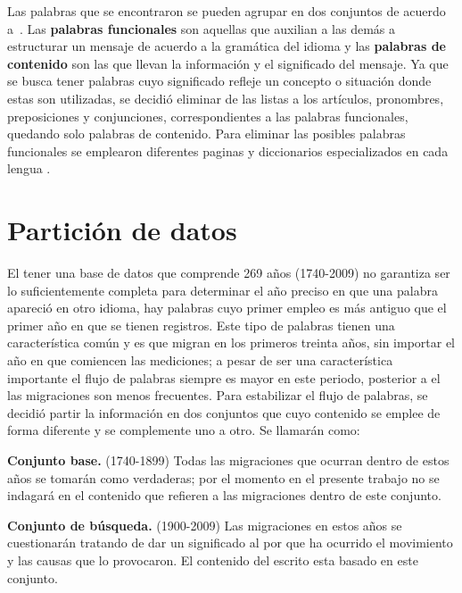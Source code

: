 Las palabras que se encontraron se pueden agrupar en dos conjuntos de acuerdo
a~\cite{contenidopal}. Las \textbf{palabras funcionales} son aquellas que
auxilian a las demás a estructurar un mensaje de acuerdo a la gramática del
idioma y las \textbf{palabras de contenido} son las que llevan la información
y el significado del mensaje. Ya  que se busca tener palabras cuyo significado
refleje un concepto o situación donde estas son utilizadas, se decidió eliminar
de las listas a los artículos, pronombres, preposiciones y conjunciones,
correspondientes a las palabras funcionales, quedando solo palabras de
contenido. Para eliminar las posibles palabras funcionales se emplearon
diferentes paginas y diccionarios especializados en cada lengua
\cite{englishdic, frenchdic, germandic, italiandic, spanishdic}. 

\section{Partición de datos} %

El tener una base de datos que comprende 269 años (1740-2009) no garantiza ser
lo suficientemente completa para determinar el año preciso en que una palabra
apareció en otro idioma, hay palabras cuyo primer empleo es más antiguo que el
primer año en que se tienen registros. Este tipo de palabras tienen una
característica común y es que migran en los primeros treinta años, sin importar
el año en que comiencen las mediciones; a pesar de ser una característica
importante el flujo de palabras siempre es mayor en este periodo, posterior a
el las migraciones son menos frecuentes. Para estabilizar el flujo de palabras,
se decidió partir la información en dos conjuntos que cuyo contenido se emplee
de forma diferente y se complemente uno a otro.  Se llamarán como:

\textbf{Conjunto base.} (1740-1899) Todas las migraciones que ocurran dentro de estos años se tomarán como verdaderas; por el momento en el presente trabajo no se indagará en el contenido que refieren a las migraciones dentro de este conjunto. 

\textbf{Conjunto de búsqueda.} (1900-2009) Las migraciones en estos años se cuestionarán tratando de dar un significado al por que ha ocurrido el
movimiento y las causas que lo provocaron. El contenido del escrito esta basado en este conjunto. 

